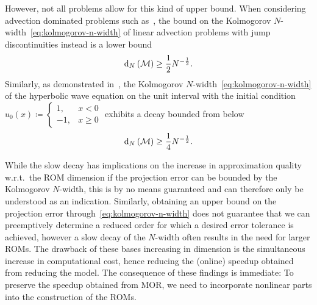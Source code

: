 However, not all problems allow for this kind of upper bound.
When considering advection dominated problems such as~\cite[Section~5.1]{Ohlberger2016}, the bound on the Kolmogorov $N$-width~\eqref{eq:kolmogorov-n-width} of linear advection problems with jump discontinuities instead is a lower bound
\begin{equation*}
    \mathop{}\!\mathrm{d}_N\left(\mathcal{M}\right) \geq \frac{1}{2} N^{- \frac{1}{2}}.
\end{equation*}
Similarly, as demonstrated in~\cite{Greif2019}, the Kolmogorov $N$-width~\eqref{eq:kolmogorov-n-width} of the hyperbolic wave equation on the unit interval with the initial condition $u_0(x) \coloneqq \begin{cases}
    1, & x < 0 \\
    -1, & x \geq 0
\end{cases}$ exhibits a decay bounded from below
\begin{equation*}
    \mathop{}\!\mathrm{d}_N\left(\mathcal{M}\right) \geq \frac{1}{4} N^{- \frac{1}{2}}.
\end{equation*}

While the slow decay has implications on the increase in approximation quality w.r.t.\ the \ac{ROM} dimension if the projection error can be bounded by the Kolmogorov $N$-width, this is by no means guaranteed and can therefore only be understood as an indication.
Similarly, obtaining an upper bound on the projection error through~\eqref{eq:kolmogorov-n-width} does not guarantee that we can preemptively determine a reduced order for which a desired error tolerance is achieved, however a slow decay of the $N$-width often results in the need for larger \acp{ROM}.
The drawback of these bases increasing in dimension is the simultaneous increase in computational cost, hence reducing the (online) speedup obtained from reducing the model.
The consequence of these findings is immediate: To preserve the speedup obtained from \ac{MOR}, we need to incorporate nonlinear parts into the construction of the \acp{ROM}.
